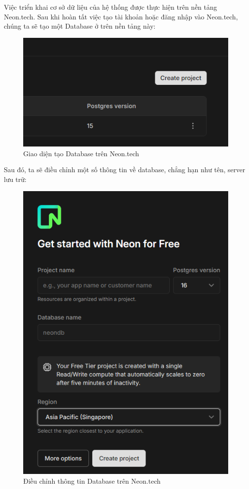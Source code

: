 Việc triển khai cơ sở dữ liệu của hệ thống được thực hiện trên nền tảng Neon.tech.
Sau khi hoàn tất việc tạo tài khoản hoặc đăng nhập vào Neon.tech, chúng ta sẽ tạo một Database ở trên nền tảng này:
\begin{figure}[H]
    \centering
    \includegraphics[width=0.7\linewidth]{Content/Hiện thực hệ thống/images/createProjectDB.png}
    \vspace{0.5cm}
    \caption{Giao diện tạo Database trên Neon.tech}
    \label{fig:Tạo Database}
\end{figure}
Sau đó, ta sẽ điều chỉnh một số thông tin về database, chẳng hạn như tên, server lưu trữ:
\begin{figure}[H]
    \centering
    \includegraphics[width=0.7\linewidth]{Content/Hiện thực hệ thống/images/projectDBinfo.png}
    \vspace{0.5cm}
    \caption{Điều chỉnh thông tin Database trên Neon.tech}
    \label{fig:Điều chỉnh thông tin Database}
\end{figure}
